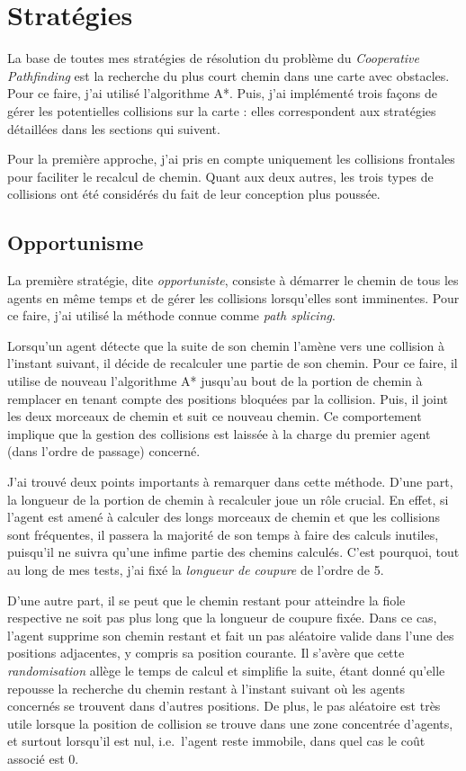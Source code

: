 \documentclass[letterpaper]{article}
\begin{document}
\section{Strat\'egies}
La base de toutes mes strat\'egies de r\'esolution du probl\`eme du \textit{Cooperative Pathfinding} est la recherche du plus court chemin dans une carte avec obstacles. 
Pour ce faire, j'ai utilis\'e l'algorithme A*.
Puis, j'ai impl\'ement\'e trois fa\c{c}ons de g\'erer les potentielles collisions sur la carte : elles correspondent aux strat\'egies d\'etaill\'ees dans les sections qui suivent.

Pour la premi\`ere approche, j'ai pris en compte uniquement les collisions frontales pour faciliter le recalcul de chemin. 
Quant aux deux autres, les trois types de collisions ont \'et\'e consid\'er\'es du fait de leur conception plus pouss\'ee.

\subsection{Opportunisme}
La premi\`ere strat\'egie, dite \textit{opportuniste}, consiste \`a d\'emarrer le chemin de tous les agents en m\^eme temps et de g\'erer les collisions lorsqu'elles sont imminentes.
Pour ce faire, j'ai utilis\'e la m\'ethode connue comme \textit{path splicing}.

Lorsqu'un agent d\'etecte que la suite de son chemin l'am\`ene vers une collision \`a l'instant suivant, il d\'ecide de recalculer une partie de son chemin.
Pour ce faire, il utilise de nouveau l'algorithme A* jusqu'au bout de la portion de chemin \`a remplacer en tenant compte des positions bloqu\'ees par la collision.
Puis, il joint les deux morceaux de chemin et suit ce nouveau chemin. Ce comportement implique que la gestion des collisions est laiss\'ee \`a la charge du premier agent (dans l'ordre de passage) concern\'e.

J'ai trouv\'e deux points importants \`a remarquer dans cette m\'ethode.
D'une part, la longueur de la portion de chemin \`a recalculer joue un r\^ole crucial.
En effet, si l'agent est amen\'e \`a calculer des longs morceaux de chemin et que les collisions sont fr\'equentes, il passera la majorit\'e de son temps \`a faire des calculs inutiles, puisqu'il ne suivra qu'une infime partie des chemins calcul\'es.
C'est pourquoi, tout au long de mes tests, j'ai fix\'e la \textit{longueur de coupure} de l'ordre de 5.

D'une autre part, il se peut que le chemin restant pour atteindre la fiole respective ne soit pas plus long que la longueur de coupure fix\'ee.
Dans ce cas, l'agent supprime son chemin restant et fait un pas al\'eatoire valide dans l'une des positions adjacentes, y compris sa position courante.
Il s'av\`ere que cette \textit{randomisation} all\`ege le temps de calcul et simplifie la suite, \'etant donn\'e qu'elle repousse la recherche du chemin restant \`a l'instant suivant o\`u les agents concern\'es se trouvent dans d'autres positions.
De plus, le pas al\'eatoire est tr\`es utile lorsque la position de collision se trouve dans une zone concentr\'ee d'agents, et surtout lorsqu'il est nul, i.e.\ l'agent reste immobile, dans quel cas le co\^ut associ\'e est 0.
\end{document}
